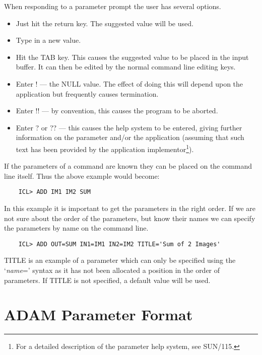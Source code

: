 \documentclass[twoside,11pt]{report}
\newcommand{\xlabel}[1]{}
\begin{document}
When responding to a parameter prompt the user has several options.
\begin{itemize}

\item Just hit the return key. The suggested value will be used.

\item Type in a new value.

\item Hit the TAB key. This causes the suggested value to be placed in the
input buffer. It can then be edited by the normal command line editing keys.

\item Enter ! --- the NULL value. The effect of doing this will depend upon
the application but frequently causes termination.

\item Enter !! --- by convention, this causes the program to be aborted.

\item Enter ? or ?? --- this causes the help system to be entered,
giving further information on the parameter and/or the application
(assuming that such text has been provided by the application
implementor\footnote{For a detailed description of the parameter help system,
see SUN/115.}).
\end{itemize}

If the parameters of a command are known they can be placed on the command
line itself. Thus the above example would become:

\begin{verbatim}
    ICL> ADD IM1 IM2 SUM
\end{verbatim}

In this example it is important to get the parameters in the right order.
If we are not sure about the order of the parameters, but know their names
we can specify the parameters by name on the command line.

\begin{verbatim}
    ICL> ADD OUT=SUM IN1=IM1 IN2=IM2 TITLE='Sum of 2 Images'
\end{verbatim}

TITLE is an example of a parameter which can only be specified using the
`{\em name}\/=' syntax as it has not been allocated a position in the order of
parameters.
If TITLE is not specified, a default value will be used.

\section{\xlabel{adam_parameter_format}ADAM Parameter Format}
\end{document}
